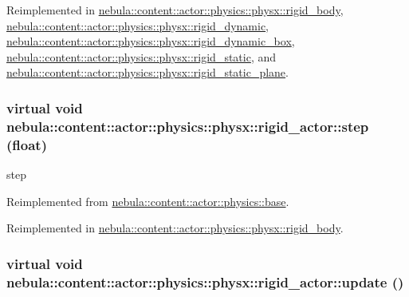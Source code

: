 Reimplemented in \hyperlink{classnebula_1_1content_1_1actor_1_1physics_1_1physx_1_1rigid__body_a92e7c3f4ca5dad35ae7c656a64a18a0c}{nebula::content::actor::physics::physx::rigid\_\-body}, \hyperlink{classnebula_1_1content_1_1actor_1_1physics_1_1physx_1_1rigid__dynamic_a88a75a1eae5e774c51f6b2afd2cb70e6}{nebula::content::actor::physics::physx::rigid\_\-dynamic}, \hyperlink{classnebula_1_1content_1_1actor_1_1physics_1_1physx_1_1rigid__dynamic__box_ae9b1ab77b71317d75e61ff1d1b14e4a1}{nebula::content::actor::physics::physx::rigid\_\-dynamic\_\-box}, \hyperlink{classnebula_1_1content_1_1actor_1_1physics_1_1physx_1_1rigid__static_ae7253d0ce8bbafb563677f786d68bb2e}{nebula::content::actor::physics::physx::rigid\_\-static}, and \hyperlink{classnebula_1_1content_1_1actor_1_1physics_1_1physx_1_1rigid__static__plane_ac700d7dbdea733b24b1088cc0c78a6a6}{nebula::content::actor::physics::physx::rigid\_\-static\_\-plane}.\hypertarget{classnebula_1_1content_1_1actor_1_1physics_1_1physx_1_1rigid__actor_af46a50e7fc8184d0c4bfb93db4a84041}{
\subsubsection[{step}]{\setlength{\rightskip}{0pt plus 5cm}virtual void nebula::content::actor::physics::physx::rigid\_\-actor::step (float)}}
\label{classnebula_1_1content_1_1actor_1_1physics_1_1physx_1_1rigid__actor_af46a50e7fc8184d0c4bfb93db4a84041}


step 

Reimplemented from \hyperlink{classnebula_1_1content_1_1actor_1_1physics_1_1base_aac025359e301532039709ea8697bb29f}{nebula::content::actor::physics::base}.

Reimplemented in \hyperlink{classnebula_1_1content_1_1actor_1_1physics_1_1physx_1_1rigid__body_a2f72e8366fb89b7a65d938b7a5082c6b}{nebula::content::actor::physics::physx::rigid\_\-body}.\hypertarget{classnebula_1_1content_1_1actor_1_1physics_1_1physx_1_1rigid__actor_a72b8760ff690a21d9e248c0fe63baed4}{
\subsubsection[{update}]{\setlength{\rightskip}{0pt plus 5cm}virtual void nebula::content::actor::physics::physx::rigid\_\-actor::update ()}}
\label{classnebula_1_1content_1_1actor_1_1physics_1_1physx_1_1rigid__actor_a72b8760ff690a21d9e248c0fe63baed4}


